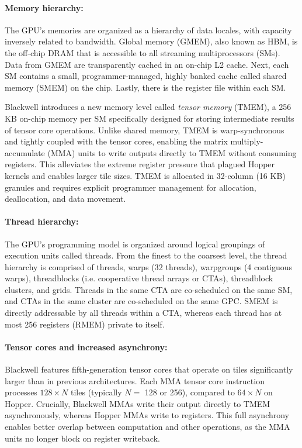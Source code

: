 \paragraph{Memory hierarchy:}
The GPU's memories are organized as a hierarchy of data locales, with capacity inversely related to bandwidth.
Global memory (GMEM), also known as HBM, is the off-chip DRAM that is accessible to all streaming multiprocessors (SMs).
Data from GMEM are transparently cached in an on-chip L2 cache.
Next, each SM contains a small, programmer-managed, highly banked cache called shared memory (SMEM) on the chip.
Lastly, there is the register file within each SM.

Blackwell introduces a new memory level called \emph{tensor memory} (TMEM), a 256 KB on-chip memory per SM specifically designed for storing intermediate results of tensor core operations. Unlike shared memory, TMEM is warp-synchronous and tightly coupled with the tensor cores, enabling the matrix multiply-accumulate (MMA) units to write outputs directly to TMEM without consuming registers. This alleviates the extreme register pressure that plagued Hopper kernels and enables larger tile sizes. TMEM is allocated in 32-column (16 KB) granules and requires explicit programmer management for allocation, deallocation, and data movement.

\paragraph{Thread hierarchy:}
The GPU's programming model is organized around logical groupings of execution units called threads.
From the finest to the coarsest level, the thread hierarchy is comprised of threads, warps (32 threads), warpgroups (4 contiguous warps), threadblocks (i.e. cooperative thread arrays or CTAs), threadblock clusters, and grids.
Threads in the same CTA are co-scheduled on the same SM, and CTAs in the same cluster are co-scheduled on the same GPC.
SMEM is directly addressable by all threads within a CTA, whereas each thread has at most 256 registers (RMEM) private to itself.

\paragraph{Tensor cores and increased asynchrony:}
Blackwell features fifth-generation tensor cores that operate on tiles significantly larger than in previous architectures. Each MMA tensor core instruction processes $128 \times N$ tiles (typically $N =$ 128 or 256), compared to $64 \times N$ on Hopper. Crucially, Blackwell MMAs write their output directly to TMEM asynchronously, whereas Hopper MMAs write to registers. This full asynchrony enables better overlap between computation and other operations, as the MMA units no longer block on register writeback.

